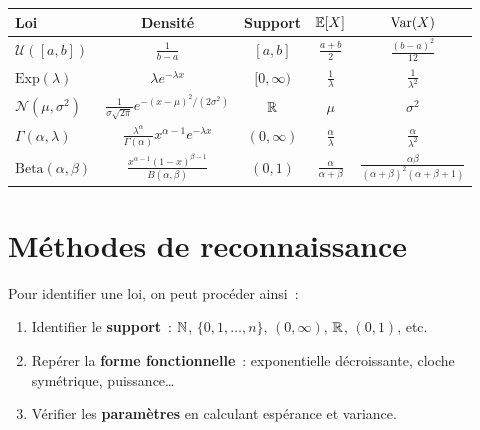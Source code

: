 \begin{formules}[title=\textbf{R\'ecapitulatif des lois continues}]
\begin{center}
\renewcommand{\arraystretch}{1.4}
\begin{tabular}{lcccc}
    \toprule
    \textbf{Loi} & \textbf{Densit\'e} & \textbf{Support} & $\mathbb{E}[X]$ & $\mathrm{Var}(X)$ \\
    \midrule
    $\mathcal{U}([a,b])$ & $\frac{1}{b-a}$ & $[a,b]$ & $\frac{a+b}{2}$ & $\frac{(b-a)^2}{12}$ \\[4pt]
    $\text{Exp}(\lambda)$ & $\lambda e^{-\lambda x}$ & $[0,\infty)$ & $\frac{1}{\lambda}$ & $\frac{1}{\lambda^2}$ \\[4pt]
    $\mathcal{N}(\mu,\sigma^2)$ & $\frac{1}{\sigma\sqrt{2\pi}}e^{-(x-\mu)^2/(2\sigma^2)}$ & $\mathbb{R}$ & $\mu$ & $\sigma^2$ \\[4pt]
    $\Gamma(\alpha,\lambda)$ & $\frac{\lambda^\alpha}{\Gamma(\alpha)}x^{\alpha-1}e^{-\lambda x}$ & $(0,\infty)$ & $\frac{\alpha}{\lambda}$ & $\frac{\alpha}{\lambda^2}$ \\[4pt]
    $\text{Beta}(\alpha,\beta)$ & $\frac{x^{\alpha-1}(1-x)^{\beta-1}}{B(\alpha,\beta)}$ & $(0,1)$ & $\frac{\alpha}{\alpha+\beta}$ & $\frac{\alpha\beta}{(\alpha+\beta)^2(\alpha+\beta+1)}$ \\
    \bottomrule
\end{tabular}
\end{center}
\end{formules}

\section{M\'ethodes de reconnaissance}

\begin{remarque}
Pour identifier une loi, on peut proc\'eder ainsi~:
\begin{enumerate}
    \item Identifier le \textbf{support}~: $\mathbb{N}$, $\{0,1,\ldots,n\}$, $(0,\infty)$,
          $\mathbb{R}$, $(0,1)$, etc.
    \item Rep\'erer la \textbf{forme fonctionnelle}~: exponentielle d\'ecroissante,
          cloche sym\'etrique, puissance\ldots
    \item V\'erifier les \textbf{param\`etres} en calculant esp\'erance et variance.
\end{enumerate}
\end{remarque}

